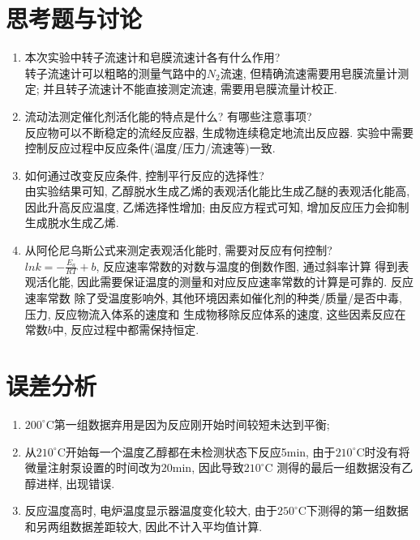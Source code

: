 \documentclass[a4paper]{article}
\begin{document}
\section{思考题与讨论}
\begin{enumerate}
	\item 本次实验中转子流速计和皂膜流速计各有什么作用?\\
	转子流速计可以粗略的测量气路中的$N_{2}$流速, 
	但精确流速需要用皂膜流量计测定; 并且转子流速计不能直接测定流速, 
	需要用皂膜流量计校正.
	\item 流动法测定催化剂活化能的特点是什么? 有哪些注意事项?\\
	反应物可以不断稳定的流经反应器, 生成物连续稳定地流出反应器.
	实验中需要控制反应过程中反应条件(温度/压力/流速等)一致.
	\item 如何通过改变反应条件, 控制平行反应的选择性?\\
	由实验结果可知, 乙醇脱水生成乙烯的表观活化能比生成乙醚的表观活化能高, 
	因此升高反应温度, 乙烯选择性增加; 由反应方程式可知, 增加反应压力会抑制
	生成脱水生成乙烯. 
	\item 从阿伦尼乌斯公式来测定表观活化能时, 需要对反应有何控制?\\
	$lnk = -\frac{E_{a}}{RT} + b$, 反应速率常数的对数与温度的倒数作图, 通过斜率计算
	得到表观活化能, 因此需要保证温度的测量和对应反应速率常数的计算是可靠的. 反应速率常数
	除了受温度影响外, 其他环境因素如催化剂的种类/质量/是否中毒, 压力, 反应物流入体系的速度和
	生成物移除反应体系的速度, 这些因素反应在常数$b$中, 反应过程中都需保持恒定.
\end{enumerate}
\section{误差分析}
\begin{enumerate}
	\item $200^\circ$C第一组数据弃用是因为反应刚开始时间较短未达到平衡; 
	\item 从$210^\circ$C开始每一个温度乙醇都在未检测状态下反应5min, 
	由于$210^\circ$C时没有将微量注射泵设置的时间改为20min, 因此导致$210^\circ$C
	测得的最后一组数据没有乙醇进样, 出现错误.
	\item 反应温度高时, 电炉温度显示器温度变化较大, 由于$250^\circ$C下测得的第一组数据
	和另两组数据差距较大, 因此不计入平均值计算.
\end{enumerate}
\newpage
\end{document}
